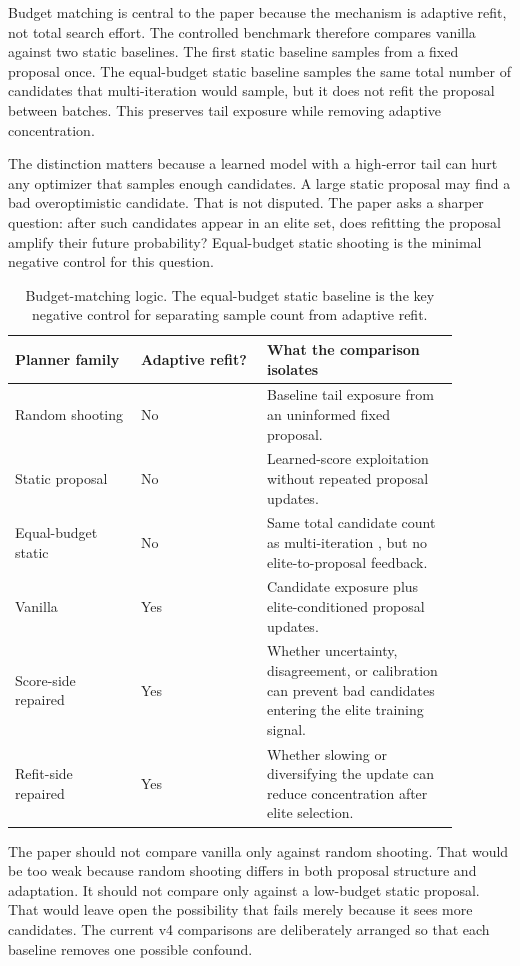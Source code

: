 Budget matching is central to the paper because the mechanism is adaptive
refit, not total search effort. The controlled benchmark therefore compares
vanilla \cem{} against two static baselines. The first static baseline samples
from a fixed proposal once. The equal-budget static baseline samples the same
total number of candidates that multi-iteration \cem{} would sample, but it
does not refit the proposal between batches. This preserves tail exposure while
removing adaptive concentration.

The distinction matters because a learned model with a high-error tail can
hurt any optimizer that samples enough candidates. A large static proposal may
find a bad overoptimistic candidate. That is not disputed. The paper asks a
sharper question: after such candidates appear in an elite set, does refitting
the proposal amplify their future probability? Equal-budget static shooting is
the minimal negative control for this question.

\begin{table}[t]
\centering
\small
\begin{tabular}{p{0.25\linewidth}p{0.25\linewidth}p{0.38\linewidth}}
\toprule
Planner family & Adaptive refit? & What the comparison isolates \\
\midrule
Random shooting & No & Baseline tail exposure from an uninformed fixed
proposal. \\
Static proposal & No & Learned-score exploitation without repeated proposal
updates. \\
Equal-budget static & No & Same total candidate count as multi-iteration
\cem{}, but no elite-to-proposal feedback. \\
Vanilla \cem{} & Yes & Candidate exposure plus elite-conditioned proposal
updates. \\
Score-side repaired \cem{} & Yes & Whether uncertainty, disagreement, or
calibration can prevent bad candidates entering the elite training signal. \\
Refit-side repaired \cem{} & Yes & Whether slowing or diversifying the update
can reduce concentration after elite selection. \\
\bottomrule
\end{tabular}
\caption{Budget-matching logic. The equal-budget static baseline is the key
negative control for separating sample count from adaptive refit.}
\label{tab:budget-matching}
\end{table}

The paper should not compare vanilla \cem{} only against random shooting. That
would be too weak because random shooting differs in both proposal structure
and adaptation. It should not compare only against a low-budget static
proposal. That would leave open the possibility that \cem{} fails merely
because it sees more candidates. The current v4 comparisons are deliberately
arranged so that each baseline removes one possible confound.

